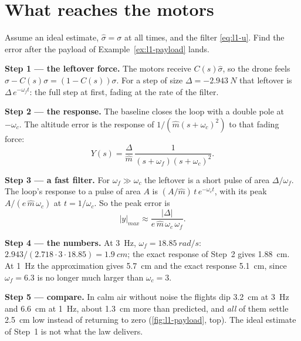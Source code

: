 \section{What reaches the motors}

\begin{example}
\label{ex:l1-peak}
Assume an ideal estimate, $\hat\sigma = \sigma$ at all times, and the filter \cref{eq:l1-u}. Find the error after the payload of Example~\ref{ex:l1-payload} lands.

\textbf{Step 1 — the leftover force.} The motors receive $C(s)\hat\sigma$, so the drone feels $\sigma - C(s)\sigma = (1 - C(s))\sigma$. For a step of size $\Delta = \SI{-2.943}{N}$ that leftover is $\Delta\,e^{-\omega_ft}$: the full step at first, fading at the rate of the filter.

\textbf{Step 2 — the response.} The baseline closes the loop with a double pole at $-\omega_c$. The altitude error is the response of $1/(\hat m(s + \omega_c)^2)$ to that fading force:
\begin{equation*}
  Y(s) = \frac{\Delta}{\hat m}\,\frac{1}{(s + \omega_f)(s + \omega_c)^2} .
\end{equation*}

\textbf{Step 3 — a fast filter.} For $\omega_f \gg \omega_c$ the leftover is a short pulse of area $\Delta/\omega_f$. The loop's response to a pulse of area $A$ is $(A/\hat m)\,t\,e^{-\omega_ct}$, with its peak $A/(e\,\hat m\,\omega_c)$ at $t = 1/\omega_c$. So the peak error is
\begin{equation*}
  |y|_{max} \approx \frac{|\Delta|}{e\,\hat m\,\omega_c\,\omega_f} .
\end{equation*}

\textbf{Step 4 — the numbers.} At \SI{3}{Hz}, $\omega_f = \SI{18.85}{rad/s}$: $2.943/(2.718 \cdot 3 \cdot 18.85) = \SI{1.9}{cm}$; the exact response of Step~2 gives \SI{1.88}{cm}. At \SI{1}{Hz} the approximation gives \SI{5.7}{cm} and the exact response \SI{5.1}{cm}, since $\omega_f = 6.3$ is no longer much larger than $\omega_c = 3$.

\textbf{Step 5 — compare.} In calm air without noise the flights dip \SI{3.2}{cm} at \SI{3}{Hz} and \SI{6.6}{cm} at \SI{1}{Hz}, about \SI{1.3}{cm} more than predicted, and \emph{all} of them settle \SI{2.5}{cm} low instead of returning to zero (\cref{fig:l1-payload}, top). The ideal estimate of Step~1 is not what the law delivers.
\end{example}

